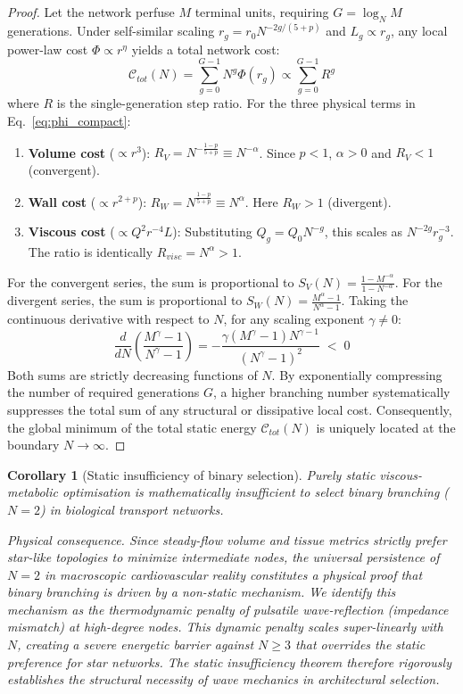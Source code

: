 \documentclass[11pt,a4paper]{article}
\newtheorem{corollary}[theorem]{Corollary}
\theoremstyle{remark}
\begin{document}
\begin{proof}
Let the network perfuse $M$ terminal units, requiring $G = \log_N M$ generations.
Under self-similar scaling $r_g = r_0 N^{-2g/(5+p)}$ and $L_g \propto r_g$, any local
power-law cost $\Phi \propto r^\eta$ yields a total network cost:
\[
  \mathcal{C}_{tot}(N) = \sum_{g=0}^{G-1} N^g \Phi(r_g) \propto \sum_{g=0}^{G-1} R^g
\]
where $R$ is the single-generation step ratio.
For the three physical terms in Eq.~\eqref{eq:phi_compact}:
\begin{enumerate}
    \item \textbf{Volume cost} ($\propto r^3$): $R_V = N^{-\frac{1-p}{5+p}} \equiv N^{-\alpha}$. Since $p<1$, $\alpha>0$ and $R_V < 1$ (convergent).
    \item \textbf{Wall cost} ($\propto r^{2+p}$): $R_W = N^{\frac{1-p}{5+p}} \equiv N^{\alpha}$. Here $R_W > 1$ (divergent).
    \item \textbf{Viscous cost} ($\propto Q^2 r^{-4} L$): Substituting $Q_g = Q_0 N^{-g}$, this scales as $N^{-2g} r_g^{-3}$. The ratio is identically $R_{visc} = N^{\alpha} > 1$.
\end{enumerate}
For the convergent series, the sum is proportional to $S_V(N) = \frac{1 - M^{-\alpha}}{1 - N^{-\alpha}}$.
For the divergent series, the sum is proportional to $S_W(N) = \frac{M^\alpha - 1}{N^\alpha - 1}$.
Taking the continuous derivative with respect to $N$, for any scaling exponent $\gamma \neq 0$:
\[
  \frac{d}{dN} \left( \frac{M^\gamma - 1}{N^\gamma - 1} \right) = - \frac{\gamma (M^\gamma - 1) N^{\gamma - 1}}{(N^\gamma - 1)^2} \;<\; 0
\]
Both sums are strictly decreasing functions of $N$. By exponentially compressing the
number of required generations $G$, a higher branching number systematically
suppresses the total sum of any structural or dissipative local cost. Consequently,
the global minimum of the total static energy $\mathcal{C}_{tot}(N)$ is uniquely
located at the boundary $N \to \infty$.
\end{proof}

\begin{corollary}[Static insufficiency of binary selection]
\label{cor:static_insufficiency}
Purely static viscous-metabolic optimisation is mathematically insufficient to select
binary branching ($N=2$) in biological transport networks. 

\emph{Physical consequence.}
Since steady-flow volume and tissue metrics strictly prefer star-like topologies to
minimize intermediate nodes, the universal persistence of $N=2$ in macroscopic
cardiovascular reality constitutes a physical proof that binary branching is driven
by a non-static mechanism. We identify this mechanism as the thermodynamic penalty of
pulsatile wave-reflection (impedance mismatch) at high-degree nodes. This dynamic
penalty scales super-linearly with $N$, creating a severe energetic barrier against
$N \geq 3$ that overrides the static preference for star networks. The static
insufficiency theorem therefore rigorously establishes the structural necessity of
wave mechanics in architectural selection.
\end{corollary}
\end{document}
